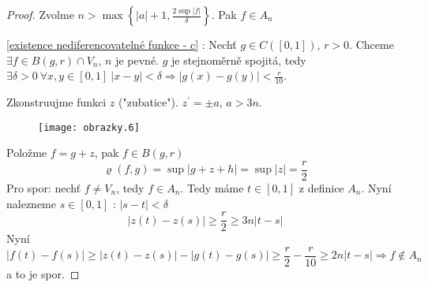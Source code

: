 \begin{proof}
Zvolme $n > \max \left\{ |a|+1, \frac{2 \sup |f|}{\delta} \right\}$. Pak $f \in A_n$

\ref{existence nediferencovatelné funkce - c} : Nechť $g \in C([0,1])$, $r > 0$. Chceme $\exists f \in B(g,r) \cap V_n$, $n$ je pevné. $g$ je stejnoměrně spojitá, tedy $\exists \delta > 0 \ \forall x,y \in [0,1] \ |x-y| < \delta \Rightarrow |g(x)-g(y)| < \frac{r}{10}$.

Zkonstruujme funkci $z$ ("zubatice"). $z^\prime = \pm a$, $a > 3n$.

\begin{figure}[!h] \begin{center}
\texttt{[image: obrazky.6]}
\end{center} \end{figure}


Položme $f = g + z$, pak $f \in B(g,r)$
$$\varrho (f,g) = \sup |g + z + h| = \sup |z| = \frac{r}{2}$$
Pro spor: nechť $f \neq V_n$, tedy $f \in A_n$. Tedy máme $t \in [0,1]$ z definice $A_n$. Nyní nalezneme $s \in [0,1] \textrm{ : } |s-t| < \delta$
$$|z(t)-z(s)| \geq \frac{r}{2} \geq 3 n |t-s|$$
Nyní
$$|f(t)-f(s)| \geq |z(t)-z(s)|-|g(t)-g(s)| \geq \frac{r}{2} - \frac{r}{10} \geq 2 n |t-s| \Rightarrow f \notin A_n$$
a to je spor.
\end{proof}




